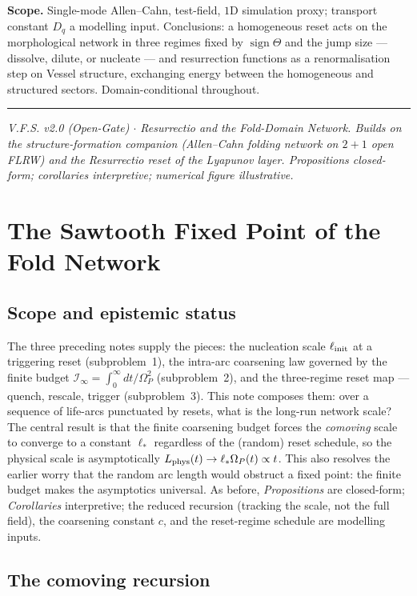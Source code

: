 \documentclass[11pt,a4paper,oneside]{book}
\newcommand{\Op}{\Omega_P}
\newcommand{\Dq}{D_q}
\newcommand{\Lp}{L_{\rm phys}}
\newcommand{\Ib}{\mathcal I}
\newcommand{\linit}{\ell_{\rm init}}
\theoremstyle{plain}
\theoremstyle{definition}
\theoremstyle{remark}
\begin{document}
\textbf{Scope.} Single-mode Allen--Cahn, test-field, $1$D simulation proxy; transport constant $\Dq$ a
modelling input. Conclusions: a homogeneous reset acts on the morphological network in three regimes
fixed by $\operatorname{sign}\Theta$ and the jump size --- dissolve, dilute, or nucleate --- and
resurrection functions as a renormalisation step on Vessel structure, exchanging energy between the
homogeneous and structured sectors. Domain-conditional throughout.

\vspace{0.5em}
\hrule
\smallskip
\noindent\footnotesize\emph{V.F.S. v2.0 (Open-Gate) $\cdot$ Resurrectio and the Fold-Domain Network.
Builds on the structure-formation companion (Allen--Cahn folding network on $2{+}1$ open FLRW) and the
Resurrectio reset of the Lyapunov layer. Propositions closed-form; corollaries interpretive; numerical
figure illustrative.}

\chapter{The Sawtooth Fixed Point of the Fold Network}

\section*{Scope and epistemic status}
The three preceding notes supply the pieces: the nucleation scale $\linit$ at a triggering reset
(subproblem~1), the intra-arc coarsening law governed by the finite budget
$\Ib_\infty=\int_0^\infty dt/\Op^2$ (subproblem~2), and the three-regime reset map --- quench, rescale,
trigger (subproblem~3). This note composes them: over a sequence of life-arcs punctuated by resets, what
is the long-run network scale? The central result is that the finite coarsening budget forces the
\emph{comoving} scale to converge to a constant $\ell_\ast$ regardless of the (random) reset schedule, so
the physical scale is asymptotically $\Lp(t)\to\ell_\ast\Op(t)\propto t$. This also resolves the earlier
worry that the random arc length would obstruct a fixed point: the finite budget makes the asymptotics
universal. As before, \emph{Propositions} are closed-form; \emph{Corollaries} interpretive; the reduced
recursion (tracking the scale, not the full field), the coarsening constant $c$, and the reset-regime
schedule are modelling inputs.

\section{The comoving recursion}
\end{document}
